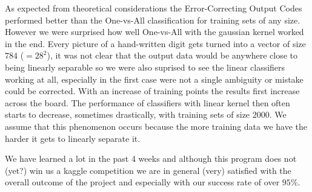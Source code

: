 \smallskip
As expected from theoretical considerations the Error-Correcting Output Codes performed better than the One-vs-All classification for training sets of any size. However we were surprised how well One-vs-All with the gaussian kernel worked in the end. Every picture of a hand-written digit gets turned into a vector of size $784$  ($=28^2$), it was not clear that the output data would be anywhere close to being linearly separable so we were also suprised to see the linear classifiers working at all, especially in the first case were not a single ambiguity or mistake could be corrected. With an increase of training points the results first increase across the board. The performance of classifiers with linear kernel then often starts to decrease, sometimes drastically, with training sets of size $2000$. We assume that this phenomenon occurs because the more training data we have the harder it gets to linearly separate it. 



We have learned a lot in the past 4 weeks and although this program does not (yet?) win us a kaggle competition we are in general (very) satisfied with the overall outcome of the project and especially with our success rate of over $95$\%.
